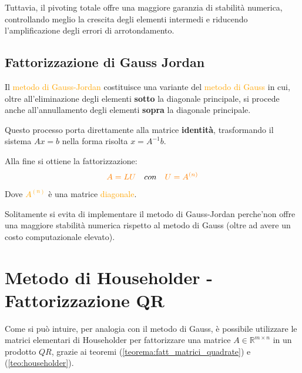 Tuttavia, il pivoting totale offre una maggiore garanzia di stabilità numerica, controllando meglio la crescita degli elementi intermedi e riducendo l'amplificazione degli errori di arrotondamento.
\subsection{Fattorizzazione di Gauss Jordan}
Il \textcolor{orange}{metodo di Gauss-Jordan} costituisce una variante del \textcolor{orange}{metodo di Gauss} in cui, oltre all'eliminazione degli elementi \textbf{sotto} la diagonale principale,
si procede anche all'annullamento degli elementi \textbf{sopra} la diagonale principale.

Questo processo porta direttamente alla matrice \textbf{identità}, trasformando il sistema $Ax=b$ nella forma risolta $x = A^{-1}b$.

Alla fine si ottiene la fattorizzazione:
\[
\textcolor{orange}{A = LU} \quad con \textcolor{orange}{ \quad U = A^{(n)}}
\]
Dove \textcolor{orange}{$A^{(n)}$} è una matrice \textcolor{orange}{diagonale}.

\begin{obs}
Solitamente si evita di implementare il metodo di Gauss-Jordan perche'non offre una maggiore stabilità numerica rispetto al metodo di Gauss
(oltre ad avere un costo computazionale elevato).
\end{obs}

\section{Metodo di  Householder - Fattorizzazione QR}

Come si può intuire, per analogia con il metodo di Gauss, è possibile utilizzare le matrici elementari di Householder per fattorizzare una matrice $A \in \mathbb{R}^{m \times n}$ in un prodotto $QR$, grazie ai teoremi (\ref{teorema:fatt_matrici_quadrate}) e (\ref{teo:householder}).

